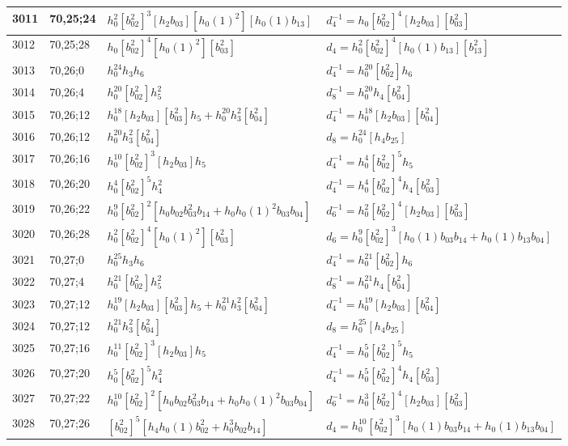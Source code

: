 \documentclass{article}
\begin{document}
\begin{longtable}{|l|l|>{\raggedright\arraybackslash}p{6cm}|>{\raggedright\arraybackslash}p{6cm}|}
\hline
3011 & 70,25;24 & $h_0^2[b_{02}^2]^3[h_2b_{03}][h_0(1)^2][h_0(1)b_{13}]$ & $d_{4}^{-1}=h_0[b_{02}^2]^4[h_2b_{03}][b_{03}^2]$\\
\hline
3012 & 70,25;28 & $h_0[b_{02}^2]^4[h_0(1)^2][b_{03}^2]$ &$d_{4}=h_0^2[b_{02}^2]^4[h_0(1)b_{13}][b_{13}^2]$\\
\hline
3013 & 70,26;0 & $h_0^{24}h_3h_6$ & $d_{4}^{-1}=h_0^{20}[b_{02}^2]h_6$\\
\hline
3014 & 70,26;4 & $h_0^{20}[b_{02}^2]h_5^2$ & $d_{8}^{-1}=h_0^{20}h_4[b_{04}^2]$\\
\hline
3015 & 70,26;12 & $h_0^{18}[h_2b_{03}][b_{03}^2]h_5 + h_0^{20}h_3^2[b_{04}^2]$ & $d_{4}^{-1}=h_0^{18}[h_2b_{03}][b_{04}^2]$\\
3016 & 70,26;12 & $h_0^{20}h_3^2[b_{04}^2]$ &$d_{8}=h_0^{24}[h_4b_{25}]$\\
\hline
3017 & 70,26;16 & $h_0^{10}[b_{02}^2]^3[h_2b_{03}]h_5$ & $d_{4}^{-1}=h_0^4[b_{02}^2]^5h_5$\\
\hline
3018 & 70,26;20 & $h_0^4[b_{02}^2]^5h_4^2$ & $d_{4}^{-1}=h_0^4[b_{02}^2]^4h_4[b_{03}^2]$\\
\hline
3019 & 70,26;22 & $h_0^9[b_{02}^2]^2[h_0b_{02}b_{03}^2b_{14} + h_0h_0(1)^2b_{03}b_{04}]$ & $d_{6}^{-1}=h_0^2[b_{02}^2]^4[h_2b_{03}][b_{03}^2]$\\
\hline
3020 & 70,26;28 & $h_0^2[b_{02}^2]^4[h_0(1)^2][b_{03}^2]$ &$d_{6}=h_0^9[b_{02}^2]^3[h_0(1)b_{03}b_{14} + h_0(1)b_{13}b_{04}]$\\
\hline
3021 & 70,27;0 & $h_0^{25}h_3h_6$ & $d_{4}^{-1}=h_0^{21}[b_{02}^2]h_6$\\
\hline
3022 & 70,27;4 & $h_0^{21}[b_{02}^2]h_5^2$ & $d_{8}^{-1}=h_0^{21}h_4[b_{04}^2]$\\
\hline
3023 & 70,27;12 & $h_0^{19}[h_2b_{03}][b_{03}^2]h_5 + h_0^{21}h_3^2[b_{04}^2]$ & $d_{4}^{-1}=h_0^{19}[h_2b_{03}][b_{04}^2]$\\
3024 & 70,27;12 & $h_0^{21}h_3^2[b_{04}^2]$ &$d_{8}=h_0^{25}[h_4b_{25}]$\\
\hline
3025 & 70,27;16 & $h_0^{11}[b_{02}^2]^3[h_2b_{03}]h_5$ & $d_{4}^{-1}=h_0^5[b_{02}^2]^5h_5$\\
\hline
3026 & 70,27;20 & $h_0^5[b_{02}^2]^5h_4^2$ & $d_{4}^{-1}=h_0^5[b_{02}^2]^4h_4[b_{03}^2]$\\
\hline
3027 & 70,27;22 & $h_0^{10}[b_{02}^2]^2[h_0b_{02}b_{03}^2b_{14} + h_0h_0(1)^2b_{03}b_{04}]$ & $d_{6}^{-1}=h_0^3[b_{02}^2]^4[h_2b_{03}][b_{03}^2]$\\
\hline
3028 & 70,27;26 & $[b_{02}^2]^5[h_4h_0(1)b_{02}^2 + h_0^3b_{02}b_{14}]$ &$d_{4}=h_0^{10}[b_{02}^2]^3[h_0(1)b_{03}b_{14} + h_0(1)b_{13}b_{04}]$\\

\end{longtable}
\end{document}
